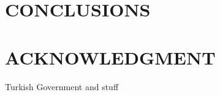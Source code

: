 \documentclass[letterpaper, 10 pt, conference]{ieeeconf}  %
\begin{document}
\section{CONCLUSIONS}

\addtolength{\textheight}{-12cm}   %


\section*{ACKNOWLEDGMENT}
Turkish Government and stuff



\end{document}
